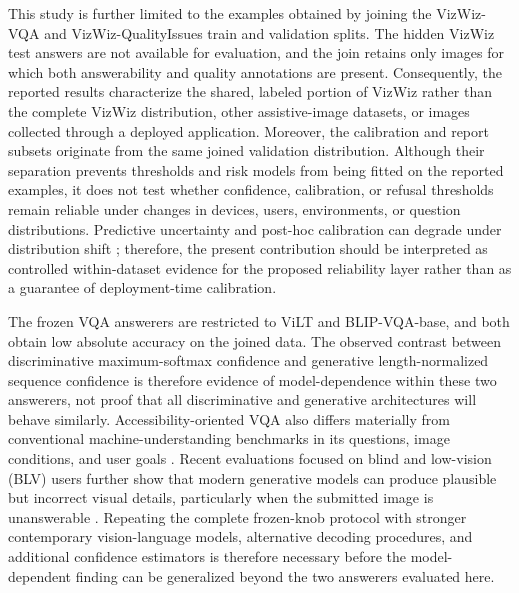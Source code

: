 \documentclass{ieeeaccess}
\newcommand{\vilt}{ViLT}
\newcommand{\blip}{BLIP}
\begin{document}
This study is further limited to the examples obtained by joining the
VizWiz-VQA and VizWiz-QualityIssues train and validation splits.
The hidden VizWiz test answers are not available for evaluation,
and the join retains only images for which both answerability and
quality annotations are present. Consequently, the reported
results characterize the shared, labeled portion of VizWiz rather
than the complete VizWiz distribution, other assistive-image
datasets, or images collected through a deployed application.
Moreover, the calibration and report subsets originate from the
same joined validation distribution. Although their separation
prevents thresholds and risk models from being fitted on the
reported examples, it does not test whether confidence,
calibration, or refusal thresholds remain reliable under changes
in devices, users, environments, or question distributions.
Predictive uncertainty and post-hoc calibration can degrade under
distribution shift \cite{ovadia2019uncertainty}; therefore, the
present contribution should be interpreted as controlled
within-dataset evidence for the proposed reliability layer rather
than as a guarantee of deployment-time calibration.

The frozen VQA answerers are restricted to \vilt{} and
\blip{}-VQA-base, and both obtain low absolute accuracy on the
joined data. The observed contrast between discriminative
maximum-softmax confidence and generative length-normalized
sequence confidence is therefore evidence of model-dependence
within these two answerers, not proof that all discriminative and
generative architectures will behave similarly.
Accessibility-oriented VQA also differs materially from
conventional machine-understanding benchmarks in its
questions, image conditions, and user goals \cite{cao2022different}. Recent
evaluations focused on blind and low-vision (BLV) users further
show that modern generative models can produce plausible but
incorrect visual details, particularly when the submitted image
is unanswerable \cite{huh2024longform}.
Repeating the complete frozen-knob
protocol with stronger contemporary vision-language models,
alternative decoding procedures, and additional confidence
estimators is therefore necessary before the model-dependent
finding can be generalized beyond the two answerers evaluated
here.
\end{document}
